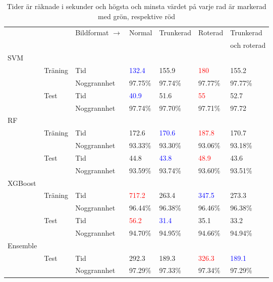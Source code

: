\documentclass[12pt,a4paper]{article}
\begin{document}
\begin{table}[b]
	\centering
	\footnotesize
	\caption{\footnotesize{Tider är räknade i sekunder och högsta och minsta värdet på varje rad är markerad med grön, respektive röd}}\label{comparison table}\vspace{6pt}
	\begin{tabular}{lll | llll}
      \hline 
			&		&		Bildformat $\rightarrow$	& Normal				& Trunkerad			& Roterad				& Trunkerad			\\
		 	&		& 			&					&					&					& och roterad			\\
      \hline 
	SVM 	&		& 			&					&					&					&					\\
			& Träning	& Tid			& \textcolor{blue}{132.4}	& 155.9				& \textcolor{red}{180}	& 155.2				\\
			&		& Noggrannhet	& 97.75\%				& 97.74\%				& 97.77\%				& 97.77\%				\\
			& Test	& Tid			& \textcolor{blue}{40.9}	& 51.6				& \textcolor{red}{55}		& 52.7				\\
			&		& Noggrannhet	& 97.74\%				& 97.70\%				& 97.71\%				& 97.72				\\
	RF 		&		& 			&					&					&					&					\\
			& Träning	& Tid			& 172.6				& \textcolor{blue}{170.6}	& \textcolor{red}{187.8}	& 170.7 				\\
			&		& Noggrannhet	& 93.33\%				& 93.30\%				& 93.06\%				& 93.18\%				\\
			& Test	& Tid			& 44.8				& \textcolor{blue}{43.8}	& \textcolor{red}{48.9}	& 43.6				\\
			&		& Noggrannhet	& 93.59\%				& 93.74\%				& 93.60\%				& 93.51\%				\\
	XGBoost 	&		& 			&					&					&					&					\\
			& Träning	& Tid			& \textcolor{red}{717.2}	& 263.4				& \textcolor{blue}{347.5}	& 273.3				\\
			&		& Noggrannhet	& 96.44\%				& 96.38\%				& 96.46\%				& 96.38\%				\\
			& Test	& Tid			& \textcolor{red}{56.2}	& \textcolor{blue}{31.4}	& 35.1				& 33.2				\\
			&		& Noggrannhet	& 94.70\%				& 94.95\%				& 94.66\%				& 94.94\%				\\
	Ensemble	&		& 			&					&					&					&					\\
			& Test	& Tid			& 292.3				& 189.3				& \textcolor{red}{326.3}	& \textcolor{blue}{189.1}	\\
			&		& Noggrannhet	& 97.29\%				& 97.33\%				& 97.34\%				& 97.29\%				\\
	\end{tabular}
\end{table}
\end{document}

